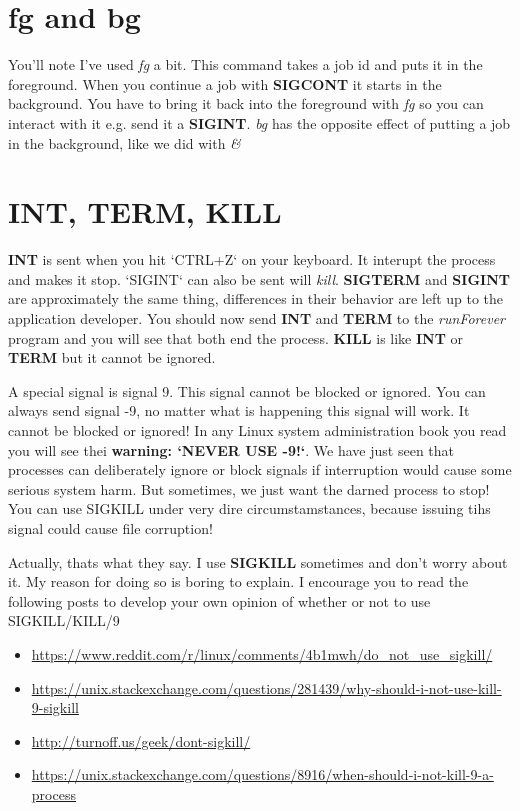 \documentclass[12pt]{article}
\begin{document}
\section{fg and bg}
You'll note I've used \textit{fg} a bit. This command takes a job id and puts it in the foreground. When you continue a job with \textbf{SIGCONT} it starts in the background. You have to bring it back into the foreground with \textit{fg} so you can interact with it e.g. send it a \textbf{SIGINT}. \textit{bg} has the opposite effect of putting a job in the background, like we did with \textit{\&}

\section{INT, TERM, KILL}
\textbf{INT} is sent when you hit `CTRL+Z` on your keyboard. It interupt the process and makes it stop. `SIGINT` can also be sent will \textit{kill}. \textbf{SIGTERM} and \textbf{SIGINT} are approximately the same thing, differences in their behavior are left up to the application developer. You should now send \textbf{INT} and \textbf{TERM} to the \textit{runForever} program and you will see that both end the process. \textbf{KILL} is like \textbf{INT} or \textbf{TERM} but it cannot be ignored.

A special signal is signal 9. This signal cannot be blocked or ignored. You can always send signal -9, no matter what is happening this signal will work. It cannot be blocked or ignored! In any Linux system administration book you read you will see thei \textbf{warning: `NEVER USE -9!`}. We have just seen that processes can deliberately ignore or block signals if interruption would cause some serious system harm. But sometimes, we just want the darned process to stop! You can use SIGKILL under very dire circumstamstances, because issuing tihs signal could cause file corruption!

Actually, thats what they say. I use \textbf{SIGKILL} sometimes and don't worry about it. My reason for doing so is boring to explain. I encourage you to read the following posts to develop your own opinion of whether or not to use SIGKILL/KILL/9

\begin{itemize}
\item \url{https://www.reddit.com/r/linux/comments/4b1mwh/do_not_use_sigkill/}
\item \url{https://unix.stackexchange.com/questions/281439/why-should-i-not-use-kill-9-sigkill}
\item \url{http://turnoff.us/geek/dont-sigkill/}
\item \url{https://unix.stackexchange.com/questions/8916/when-should-i-not-kill-9-a-process}
\end{itemize}
\end{document}
